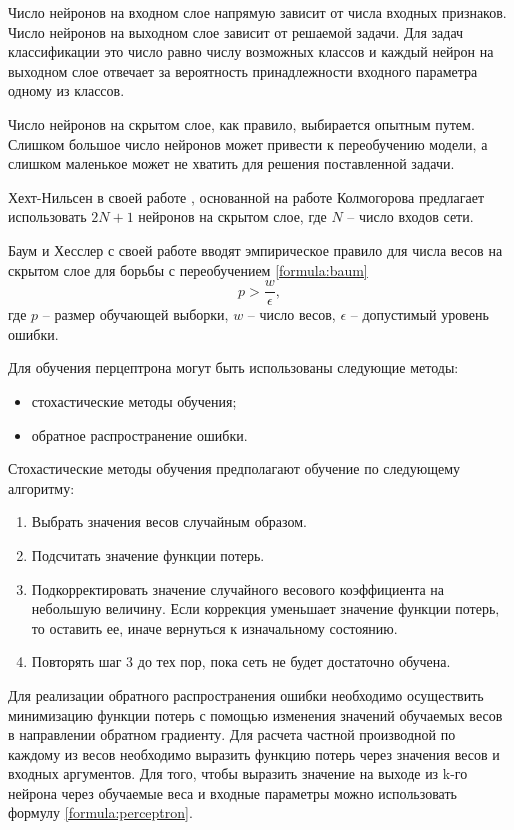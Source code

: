 Число нейронов на входном слое напрямую зависит от числа входных признаков.
Число нейронов на выходном слое зависит от решаемой задачи.
Для задач классификации это число равно числу возможных классов и каждый нейрон на выходном слое отвечает за вероятность принадлежности входного параметра одному из классов.

Число нейронов на скрытом слое, как правило, выбирается опытным путем.
Слишком большое число нейронов может привести к переобучению модели, а слишком маленькое может не хватить для решения поставленной задачи.

Хехт-Нильсен в своей работе \cite{hecht1987}, основанной на работе Колмогорова \cite{kolmogorov1957} предлагает использовать $2N + 1$ нейронов на скрытом слое, где $N$ -- число входов сети.

Баум и Хесслер с своей работе \cite{baum1989} вводят эмпирическое правило для числа весов на скрытом слое для борьбы с переобучением \ref{formula:baum}
\begin{equation}\label{formula:baum}
	p > \frac{w}{\epsilon},
\end{equation}
где $p$ -- размер обучающей выборки, $w$ -- число весов, $\epsilon$ -- допустимый уровень ошибки.

Для обучения перцептрона могут быть использованы следующие методы:
\begin{itemize}
	\item стохастические методы обучения;
	\item обратное распространение ошибки.
\end{itemize}

Стохастические методы обучения предполагают обучение по следующему алгоритму:
\begin{enumerate}
	\item Выбрать значения весов случайным образом.
	\item Подсчитать значение функции потерь.
	\item Подкорректировать значение случайного весового коэффициента на небольшую величину. Если коррекция уменьшает значение функции потерь, то оставить ее, иначе вернуться к изначальному состоянию.
	\item Повторять шаг 3 до тех пор, пока сеть не будет достаточно обучена.
\end{enumerate}

Для реализации обратного распространения ошибки необходимо осуществить минимизацию функции потерь с помощью изменения значений обучаемых весов в направлении обратном градиенту.
Для расчета частной производной по каждому из весов необходимо выразить функцию потерь через значения весов и входных аргументов.
Для того, чтобы выразить значение на выходе из k-го нейрона через обучаемые веса и входные параметры можно использовать формулу \ref{formula:perceptron}.

